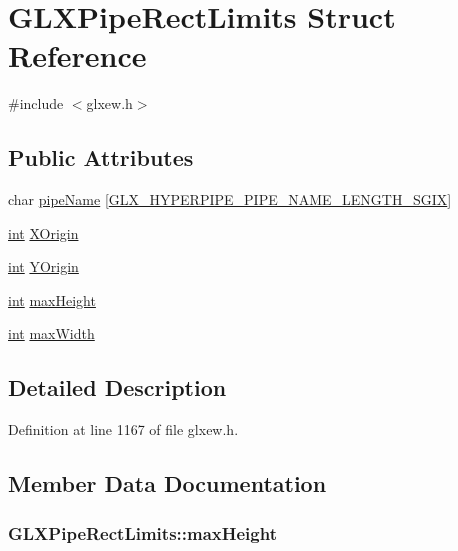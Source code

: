 \hypertarget{struct_g_l_x_pipe_rect_limits}{\section{G\-L\-X\-Pipe\-Rect\-Limits Struct Reference}
\label{struct_g_l_x_pipe_rect_limits}
}


{\ttfamily \#include $<$glxew.\-h$>$}

\subsection*{Public Attributes}
\begin{DoxyCompactItemize}
\item 
char \hyperlink{struct_g_l_x_pipe_rect_limits_ae78b4b6656101bc841946733a5b6e5ce}{pipe\-Name} \mbox{[}\hyperlink{glxew_8h_ae1c8261c0861010d8003a31d07e26005}{G\-L\-X\-\_\-\-H\-Y\-P\-E\-R\-P\-I\-P\-E\-\_\-\-P\-I\-P\-E\-\_\-\-N\-A\-M\-E\-\_\-\-L\-E\-N\-G\-T\-H\-\_\-\-S\-G\-I\-X}\mbox{]}
\item 
\hyperlink{wglew_8h_a500a82aecba06f4550f6849b8099ca21}{int} \hyperlink{struct_g_l_x_pipe_rect_limits_a3e5a965059d9f5d2ca42acd35af5bb9b}{X\-Origin}
\item 
\hyperlink{wglew_8h_a500a82aecba06f4550f6849b8099ca21}{int} \hyperlink{struct_g_l_x_pipe_rect_limits_a50e06bcf0dae95854be7d93a515199e9}{Y\-Origin}
\item 
\hyperlink{wglew_8h_a500a82aecba06f4550f6849b8099ca21}{int} \hyperlink{struct_g_l_x_pipe_rect_limits_a27572e499c0d3280031c2ad8e387c0c1}{max\-Height}
\item 
\hyperlink{wglew_8h_a500a82aecba06f4550f6849b8099ca21}{int} \hyperlink{struct_g_l_x_pipe_rect_limits_a8662c7a712b30620e25fc994adf337a1}{max\-Width}
\end{DoxyCompactItemize}


\subsection{Detailed Description}


Definition at line 1167 of file glxew.\-h.



\subsection{Member Data Documentation}
\hypertarget{struct_g_l_x_pipe_rect_limits_a27572e499c0d3280031c2ad8e387c0c1}{
\subsubsection[{max\-Height}]{ G\-L\-X\-Pipe\-Rect\-Limits\-::max\-Height}}\label{struct_g_l_x_pipe_rect_limits_a27572e499c0d3280031c2ad8e387c0c1}


